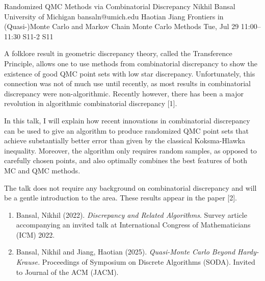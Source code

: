 \begin{talk}
  {Randomized QMC Methods via Combinatorial Discrepancy}%
  {Nikhil Bansal}%
  {University of Michigan}%
  {bansaln@umich.edu}%
  {Haotian Jiang}%
  {Frontiers in (Quasi-)Monte Carlo and Markov Chain Monte Carlo Methods}%
  {Tue, Jul 29 11:00--11:30}%
  {S11-2}%
  {S11}%
    

A folklore result in geometric discrepancy theory, called the Transference Principle, allows one to use methods from combinatorial discrepancy to show the existence of good QMC point sets with low star discrepancy.
Unfortunately, this connection was not of much use until recently, as most results in combinatorial discrepancy were non-algorithmic. Recently however, there has been a major revolution in algorithmic combinatorial discrepancy [1]. 

In this talk, I will explain how recent innovations in combinatorial discrepancy can be used to give an algorithm to produce randomized QMC point sets that  achieve substantially better error than given by the classical Koksma-Hlawka inequality. Moreover, the algorithm only requires random samples, as opposed to carefully chosen points, and also optimally combines the best features of both MC and QMC methods.  

 

The talk does not require any background on combinatorial discrepancy and will be a gentle introduction to the area. 
These results appear in the paper [2].

\medskip

\begin{enumerate}
 \item[{[1]}] Bansal, Nikhil (2022). {\it Discrepancy and Related Algorithms}. Survey article accompanying an invited talk at 
     International Congress of Mathematicians (ICM) 2022.
     
 \item[{[2]}]  Bansal, Nikhil and Jiang, Haotian (2025). {\em Quasi-Monte Carlo Beyond Hardy-Krause.} Proceedings of Symposium on Discrete Algorithms (SODA). Invited to Journal of the ACM (JACM). 
\end{enumerate}
\end{talk}

